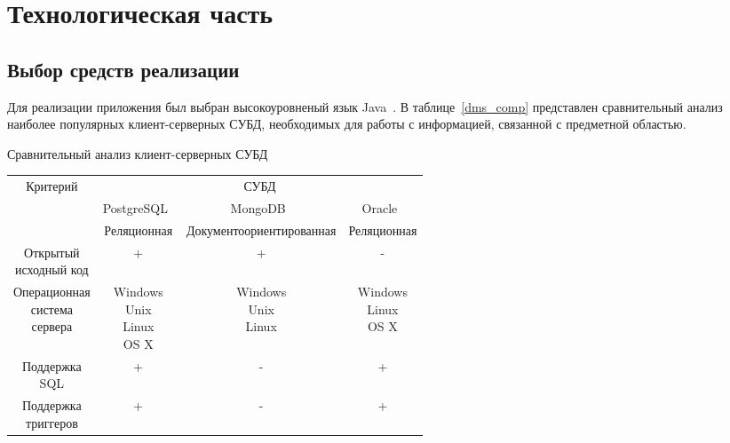 \chapter{Технологическая часть}

\section{Выбор средств реализации}

Для реализации приложения был выбран высокоуровненый язык Java~\cite{java}. В таблице~\ref{dms_comp} представлен сравнительный анализ наиболее популярных клиент-серверных СУБД, необходимых для работы с информацией, связанной с предметной областью.

\begin{center}
	\begin{threeparttable}
		\captionsetup{justification=raggedright,singlelinecheck=off}
		\caption{\label{dms_comp}Сравнительный анализ клиент-серверных СУБД}
		\centering
		\begin{tabular}{|c|c|c|c|}
			\hline
			\multirow{2}{*}{Критерий} & \multicolumn{3}{|c|}{СУБД} \\
			\cline{2-4}
			& PostgreSQL~\cite{postgresql} & MongoDB~\cite{mssql} & Oracle~\cite{oracle} \\
			\hline
			\specialcell{Тип} & Реляционная & Документоориентированная & Реляционная \\
			\hline
			\specialcell{Открытый\\исходный код} & + & + & - \\
			\hline
			\specialcell{Операционная\\система\\сервера} & \specialcell{Windows\\Unix\\Linux\\OS X} & \specialcell{Windows\\Unix\\Linux} & \specialcell{Windows\\Linux\\OS X} \\
			\hline
			\specialcell{Поддержка\\SQL} & + & - & + \\
			\hline
			\specialcell{Поддержка\\триггеров} & + & - & + \\
			\hline
		\end{tabular}
	\end{threeparttable}
\end{center}

